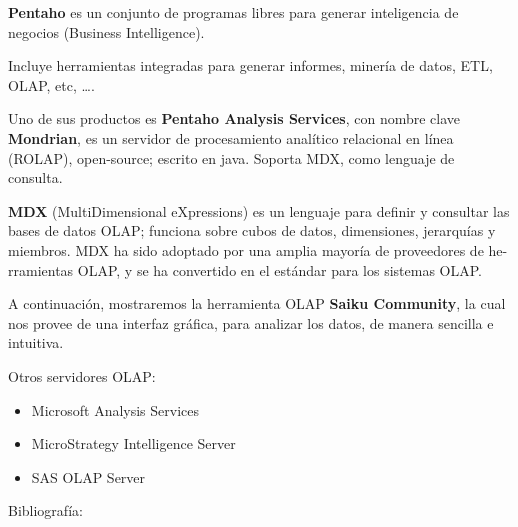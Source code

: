 \documentclass{fancyslides}
\begin{document}
\begin{frame}
\end{frame}

\begin{frame}
\misc
{
\justifying \textbf{Pentaho} es un conjunto de programas libres para generar inteligencia de negocios (Business
Intelligence).

\justifying Incluye herramientas integradas para generar informes, minería de datos, ETL, OLAP, etc, \dots.

\justifying Uno de sus productos es \textbf{Pentaho Analysis Services}, con nombre clave \textbf{Mondrian}, es un servidor de procesamiento analítico relacional en línea (ROLAP), open-source; escrito en java.
Soporta MDX, como lenguaje de consulta.
\newline

\justifying \textbf{MDX} (MultiDimensional eXpressions) es un lenguaje para definir y consultar las bases de datos OLAP; funciona sobre cubos de datos, dimensiones, jerarquías y miembros.
MDX ha sido adoptado por una amplia mayoría de proveedores de he-rramientas OLAP, y se ha convertido en el estándar para los sistemas OLAP.

}
\end{frame}

\begin{frame}
\misc
{
\justifying A continuación, mostraremos la herramienta OLAP \textbf{Saiku Community}, la cual nos provee de una interfaz gráfica, para analizar
los datos, de manera sencilla e intuitiva.
\newline

Otros servidores OLAP:

\begin{itemize}
  \item Microsoft Analysis Services
  \item MicroStrategy Intelligence Server
  \item SAS OLAP Server
\end{itemize}

}
\end{frame}


\begin{frame}
\misc
{ Bibliografía:

\printbibliography
}
\end{frame}
\end{document}
